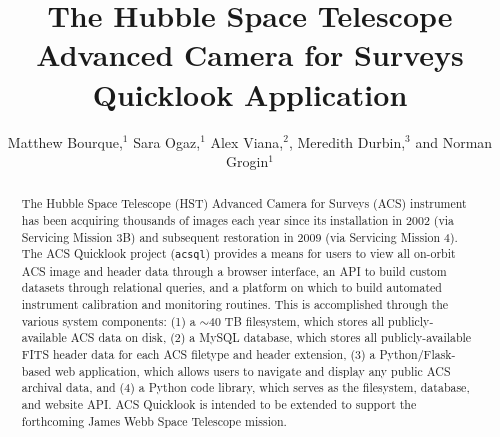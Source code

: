 \documentclass[11pt,twoside]{article}
\begin{document}
\title{The Hubble Space Telescope Advanced Camera for Surveys Quicklook Application}

\author{Matthew Bourque,$^1$ Sara Ogaz,$^1$ Alex Viana,$^2$, Meredith Durbin,$^3$ and Norman Grogin$^1$
}


\begin{abstract}
The Hubble Space Telescope (HST) Advanced Camera for Surveys (ACS) instrument has been acquiring thousands of images each year
since its installation in 2002 (via Servicing Mission 3B) and subsequent restoration in 2009 (via Servicing Mission 4).
The ACS Quicklook project (\texttt{acsql}) provides a means for users to view all on-orbit ACS image and header data through a
browser interface, an API to build custom datasets through relational queries, and a platform on which to build automated
instrument calibration and monitoring routines.  This is accomplished through the various system components: (1) a $\sim$40 TB
filesystem, which stores all publicly-available ACS data on disk, (2) a MySQL database, which stores all publicly-available
FITS header data for each ACS filetype and header extension, (3) a Python/Flask-based web application, which allows users to
navigate and display any public ACS archival data, and (4) a Python code library, which serves as the filesystem, database,
and website API.  ACS Quicklook is intended to be extended to support the forthcoming James Webb Space Telescope mission.
\end{abstract}
\end{document}
